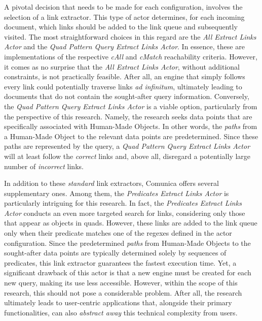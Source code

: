 \documentclass[conference]{IEEEtran}
\begin{document}
A pivotal decision that needs to be made for each configuration, involves the selection of a link extractor. This type of actor determines, for each incoming document, which links should be added to the link queue and subsequently visited. The most straightforward choices in this regard are the \textit{All Extract Links Actor} and the \textit{Quad Pattern Query Extract Links Actor}. In essence, these are implementations of the respective \textit{cAll} and \textit{cMatch} reachability criteria. However, it comes as no surprise that the \textit{All Extract Links Actor}, without additional constraints, is not practically feasible. After all, an engine that simply follows every link could potentially traverse links \textit{ad infinitum}, ultimately leading to documents that do not contain the sought-after query information. Conversely, the \textit{Quad Pattern Query Extract Links Actor} is a viable option, particularly from the perspective of this research. Namely, the research seeks data points that are specifically associated with Human-Made Objects. In other words, the \textit{paths} from a Human-Made Object to the relevant data points are predetermined. Since these paths are represented by the query, a \textit{Quad Pattern Query Extract Links Actor} will at least follow the \textit{correct} links and, above all, disregard a potentially large number of \textit{incorrect} links.

In addition to these \textit{standard} link extractors, Comunica offers several supplementary ones. Among them, the \textit{Predicates Extract Links Actor} is particularly intriguing for this research. In fact, the \textit{Predicates Extract Links Actor} conducts an even more targeted search for links, considering only those that appear as objects in quads. However, these links are added to the link queue only when their predicate matches one of the regexes defined in the actor configuration. Since the predetermined \textit{paths} from Human-Made Objects to the sought-after data points are typically determined solely by sequences of predicates, this link extractor guarantees the fastest execution time. Yet, a significant drawback of this actor is that a new engine must be created for each new query, making its use less accessible. However, within the scope of this research, this should not pose a considerable problem. After all, the research ultimately leads to user-centric applications that, alongside their primary functionalities, can also \textit{abstract away} this technical complexity from users.
\end{document}
